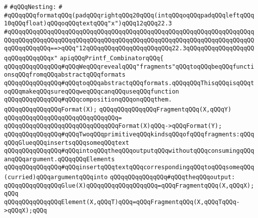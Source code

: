 \verb|#|\newline
\verb|#qQQqNesting:|\newline
\verb|#|\newline
\verb|#qQQqqQQqformatqQQq(padqQQqrightqQQq20qQQq(intqQQqoqQQqpadqQQqleftqQQq10qQQqfloat)qQQqoqQQqtextqQQq"x")qQQq12qQQq22.3|\newline
\verb|#qQQqqQQqqQQqqQQqqQQqqQQqqQQqqQQqqQQqqQQqqQQqqQQqqQQqqQQqqQQqqQQqqQQqqQQqqQQqqQQqqQQqqQQqqQQqqQQqqQQqqQQqqQQqqQQqqQQqqQQqqQQqqQQqqQQqqQQqqQQqqQQqqQQqqQQq==>qQQq"12qQQqqQQqqQQqqQQqqQQqqQQq22.3qQQqqQQqqQQqqQQqqQQqqQQqqQQqqQQqx"|\newline
\newline
\verb|apiqQQqPrintf_CombinatorqQQq{|\newline
\newline
\verb|qQQqqQQqqQQqqQQq#qQQqWeqQQqrevealqQQq"fragments"qQQqtoqQQqbeqQQqfunctionsqQQqfromqQQqabstractqQQqformats|\newline
\verb|qQQqqQQqqQQqqQQq#qQQqtoqQQqabstractqQQqformats.qQQqqQQqThisqQQqisqQQqtoqQQqmakeqQQqsureqQQqweqQQqcanqQQquseqQQqfunction|\newline
\verb|qQQqqQQqqQQqqQQq#qQQqcompositionqQQqonqQQqthem.|\newline
\newline
\verb|qQQqqQQqqQQqqQQqFormat(X);|\newline
\newline
\verb|qQQqqQQqqQQqqQQqFragmentqQQq(X,qQQqY)|\newline
\verb|qQQqqQQqqQQqqQQqqQQqqQQqqQQqqQQq=|\newline
\verb|qQQqqQQqqQQqqQQqqQQqqQQqqQQqqQQqFormat(X)qQQq->qQQqFormat(Y);|\newline
\newline
\verb|qQQqqQQqqQQqqQQq#qQQqTwoqQQqprimitiveqQQqkindsqQQqofqQQqfragments:qQQqqQQqGlueqQQqinsertsqQQqsomeqQQqtext|\newline
\verb|qQQqqQQqqQQqqQQq#qQQqintoqQQqtheqQQqoutputqQQqwithoutqQQqconsumingqQQqanqQQqargument.qQQqqQQqElements|\newline
\verb|qQQqqQQqqQQqqQQq#qQQqinsertqQQqtextqQQqcorrespondingqQQqtoqQQqsomeqQQq(curried)qQQqargumentqQQqinto|\newline
\verb|qQQqqQQqqQQqqQQq#qQQqtheqQQqoutput:|\newline
\newline
\verb|qQQqqQQqqQQqqQQqGlue(X)qQQqqQQqqQQqqQQqqQQq=qQQqFragmentqQQq(X,qQQqX);qQQq|\newline
\verb|qQQqqQQqqQQqqQQqElement(X,qQQqT)qQQq=qQQqFragmentqQQq(X,qQQqTqQQq->qQQqX);qQQq|\newline
